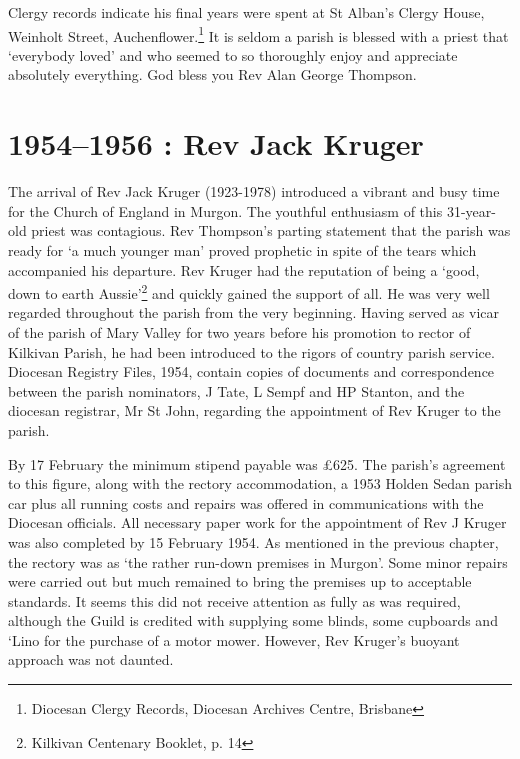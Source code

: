 Clergy records indicate his final years were spent at St Alban's Clergy
House, Weinholt Street, Auchenflower.\footnote{Diocesan Clergy Records,
  Diocesan Archives Centre, Brisbane} It is seldom a parish is blessed
with a priest that `everybody loved' and who seemed to so thoroughly
enjoy and appreciate absolutely everything. God bless you Rev Alan
George Thompson.

\printendnotes
\setcounter{endnote}{0}
\chapter{1954--1956 : Rev Jack Kruger}

The arrival of Rev Jack Kruger (1923-1978) introduced a vibrant and busy
time for the Church of England in Murgon. The youthful enthusiasm of
this 31-year-old priest was contagious. Rev Thompson's parting statement
that the parish was ready for `a much younger man' proved prophetic in
spite of the tears which accompanied his departure. Rev Kruger had the
reputation of being a `good, down to earth Aussie'\footnote{Kilkivan
  Centenary Booklet, p. 14} and quickly gained the support of all. He
was very well regarded throughout the parish from the very beginning.
Having served as vicar of the parish of Mary Valley for two years before
his promotion to rector of Kilkivan Parish, he had been introduced to
the rigors of country parish service. Diocesan Registry Files, 1954,
contain copies of documents and correspondence between the parish
nominators, J Tate, L Sempf and HP Stanton, and the diocesan registrar,
Mr St John, regarding the appointment of Rev Kruger to the parish.

By 17 February the minimum stipend payable was \pounds625. The parish's
agreement to this figure, along with the rectory accommodation, a 1953
Holden Sedan parish car plus all running costs and repairs was offered
in communications with the Diocesan officials. All necessary paper work
for the appointment of Rev J Kruger was also completed by 15 February
1954. As mentioned in the previous chapter, the rectory was as `the
rather run-down premises in Murgon'. Some minor repairs were carried out
but much remained to bring the premises up to acceptable standards. It
seems this did not receive attention as fully as was required, although
the Guild is credited with supplying some blinds, some cupboards and
`Lino for the purchase of a motor mower. However, Rev Kruger's buoyant
approach was not daunted.

